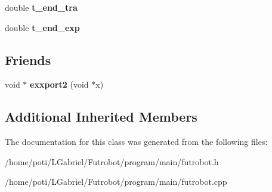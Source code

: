 \begin{DoxyCompactItemize}
\item 
double {\bfseries t\+\_\+end\+\_\+tra}\hypertarget{classFutrobot_a2e2f5df1ddb593a2134841e663eab244}{}\label{classFutrobot_a2e2f5df1ddb593a2134841e663eab244}

\item 
double {\bfseries t\+\_\+end\+\_\+exp}\hypertarget{classFutrobot_ac0936fcb7161e1b4f9e736c7b6931496}{}\label{classFutrobot_ac0936fcb7161e1b4f9e736c7b6931496}

\end{DoxyCompactItemize}
\subsection*{Friends}
\begin{DoxyCompactItemize}
\item 
void $\ast$ {\bfseries exxport2} (void $\ast$x)\hypertarget{classFutrobot_a2ff18974d4a516f24cd72ee5a5717dd3}{}\label{classFutrobot_a2ff18974d4a516f24cd72ee5a5717dd3}

\end{DoxyCompactItemize}
\subsection*{Additional Inherited Members}


The documentation for this class was generated from the following files\+:\begin{DoxyCompactItemize}
\item 
/home/poti/\+L\+Gabriel/\+Futrobot/program/main/futrobot.\+h\item 
/home/poti/\+L\+Gabriel/\+Futrobot/program/main/futrobot.\+cpp\end{DoxyCompactItemize}

